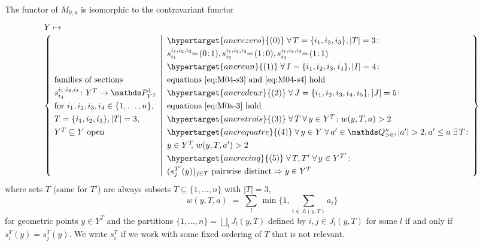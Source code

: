 \documentclass[ALCO,ThmDefs,Unicode,epreuves]{cedram}
\def\Q{\mathds Q}
\def\P{\mathds P}
\begin{document}
\begin{theo}\label{thm:functorM0a}
The functor of $\overline{M}_{0,a}$ is isomorphic to the contravariant functor
\begin{equation}\label{eq:M0a-functor} 
\begin{array}{l}
Y\mapsto\\
\left\{\!
\begin{array}{l}
\text{families of sections}\\
s^{i_1,i_2,i_3}_{i_4}\colon Y^T\to\P^1_{Y^T}\\
\text{for $i_1,i_2,i_3,i_4\in\{1,\ldots,n\}$,}\\
T=\{i_1,i_2,i_3\}, |T|=3,\\
\text{$Y^T\subseteq Y$ open}
\end{array}\!\!
\left|
{\renewcommand{\arraystretch}{1.3}
\begin{array}{l}
\hypertarget{ancrezero}{(0)}\;\forall\,T=\{i_1,i_2,i_3\}, |T|=3\colon\\
s^{i_1,i_2,i_3}_{i_1}\!\!=\!(0\!:\!1),s^{i_1,i_2,i_3}_{i_2}\!\!=\!(1\!:\!0), 
s^{i_1,i_2,i_3}_{i_3}\!\!=\!(1\!:\!1)\\
\hypertarget{ancreun}{(1)}\;\forall\,I=\{i_1,i_2,i_3,i_4\}, |I|=4\colon\\
\text{equations~\eqref{eq:M04-s3} and~\eqref{eq:M04-s4} hold}\\
\hypertarget{ancredeux}{(2)}\;\forall\,J=\{i_1,i_2,i_3,i_4,i_5\}, |J|=5\colon\\
\text{equations~\eqref{eq:M0a-3} hold}\\
\hypertarget{ancretrois}{(3)}\;\forall\,T\:\forall\,y\in Y^T\colon w(y,T,a)>2\\
\hypertarget{ancrequatre}{(4)}\;\forall\,y\in Y\;\forall\,a'\in\Q_{>0}^n,|a'|>2, a'\leq a\;\exists\,T\colon\\ 
y\in Y^T\!\!,\,w(y,T,a')>2\\
\hypertarget{ancrecinq}{(5)}\;\forall\,T,T'\;\forall\,y\in Y^{T'}\colon\\
\text{$(s^{T'}_j(y))_{j\in T}$ pairwise distinct}\Rightarrow y\in Y^T
\end{array}}\!\!\!
\right.\right\}
\end{array}
\end{equation}
where sets $T$ (same for $T'$) are always subsets $T\subseteq\{1,\ldots,n\}$ with $|T|=3$,
\[\textstyle
w(y,T,a)\;=\;\sum_l\,\min\big\{1,\sum_{i\in J_l(y,T)}a_i\big\}
\]
for geometric points $y\in Y^T$ and the partitions $\{1,\ldots,n\}=\bigsqcup_lJ_l(y,T)$ 
defined by $i,j\in J_l(y,T)$ for some $l$ if and only if $s_i^T(y)=s_j^T(y)$.
We write $s^T_i$ if we work with some fixed ordering of $T$ that is not 
relevant.
\end{theo}
\end{document}
